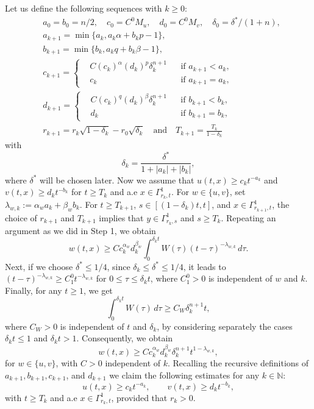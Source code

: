 \documentclass[11pt,reqno]{amsart}
\begin{document}
	\medskip
	 Let us define the following sequences with $k\ge 0$: 
	\begin{align*}
		&a_0=b_0= n/2, \quad c_0=C^0M_u,\quad d_0=C^0M_v,\quad \delta_0=\delta^*/(1+n),\\
		&a_{k+1}=\min\{a_k,a_{k}\alpha+b_{k}p-1\},\\
		&b_{k+1}=\min\{b_k,a_{k}q+b_{k}\beta-1\}, \\
		&c_{k+1}=\left\{
		\begin{aligned}
			&C(c_{k})^{\alpha}(d_{k})^{p}\delta^{n+1}_k&&\text{if }a_{k+1}<a_k,\\
			&c_{k}&&\text{if }a_{k+1}=a_{k},
		\end{aligned}
		\right.\\
		&d_{k+1}=\left\{
		\begin{aligned}
			&C(c_{k})^{q}(d_{k})^{\beta}\delta^{n+1}_{k}&&\text{if }b_{k+1}<b_{k},\\
			&d_k &&\text{if }b_{k+1}=b_k,
		\end{aligned}
		\right. \\
		&r_{k+1}=r_k\sqrt{1-\delta_k}-r_0\sqrt{\delta_k}\quad\text{and}\quad T_{k+1}=\frac{T_k}{1-\delta_k}
	\end{align*}
	with
	$$ \delta_k=\frac{\delta^*}{1+|a_k|+|b_k|}, $$ where $\delta^*$ will be chosen later. Now we assume that $u(t,x)\geq c_kt^{-a_k}$ and $v(t,x)\geq d_kt^{-b_k}$ for $t\geq T_k$ and a.e $x\in\Gamma^1_{r_k,t}$. For $w\in\{u,v\}$, set $\lambda_{w,k}:=\alpha_w a_k+\beta_w b_k$. For $t\geq T_{k+1}$, $s\in[(1-\delta_k)t,t]$, and $x\in\Gamma^1_{r_{k+1},t}$, the choice of $r_{k+1}$ and $T_{k+1}$ implies that $y\in \Gamma^1_{r_k,s}$ and $s\geq T_k$. %
	Repeating an argument as we did in Step 1, we obtain
	\[
	w(t,x)
	\geq Cc_k^{\alpha_w}d_k^{\beta_w}
	\int_0^{\delta_kt}W(\tau)(t-\tau)^{-\lambda_{w,k}}\,d\tau.
	\]
	Next, if we choose $\delta^*\leq 1/4$, since $\delta_k\leq \delta^*\leq 1/4$, it leads to $(t-\tau)^{-\lambda_{w,k}}
	\geq C^0_1t^{-\lambda_{w,k}}$ for $0\leq\tau\leq\delta_kt$, where $C^0_1>0$ is independent of $w$ and $k$. Finally, for any $t\geq1$, we get
	\[
	\int_0^{\delta_k t}W(\tau)\,d\tau
	\geq C_W\delta_k^{n+1}t,
	\]
	where $C_W>0$ is independent of $t$ and $\delta_k$, by considering separately the cases $\delta_k t\leq1$ and $\delta_k t>1$. Consequently, we obtain
	\[
	w(t,x) 
	\geq Cc_k^{\alpha_w}d_k^{\beta_w}
	\delta_k^{n+1}t^{1-\lambda_{w,k}},
	\]
	for $w\in \{u,v\}$, with $C>0$ independent of $k$. Recalling the recursive definitions of $a_{k+1},b_{k+1},c_{k+1}$, and $d_{k+1}$ we claim the following estimates for any $k\in\mathbb N$:
	\begin{equation} \label{Relation_a_k-b_k}
		u(t,x)\geq c_kt^{-a_k},
		\qquad
		v(t,x)\geq d_kt^{-b_k},
	\end{equation}
	with $t\geq T_k$ and a.e $x\in\Gamma^1_{r_k,t}$, provided that $r_k>0$. \medskip
	
\end{document}
